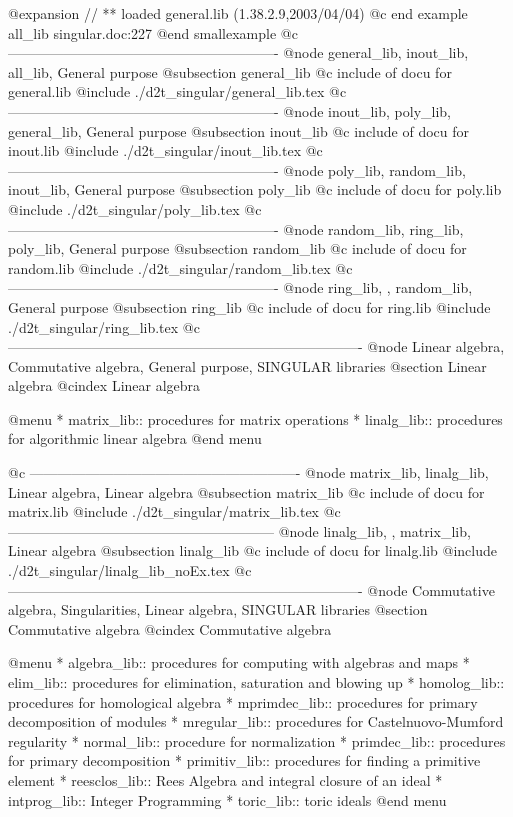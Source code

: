 @expansion{} // ** loaded general.lib (1.38.2.9,2003/04/04)
@c end example all_lib singular.doc:227
@end smallexample
@c ----------------------------------------------------------
@node general_lib, inout_lib, all_lib, General purpose
@subsection general_lib
@c include of docu for general.lib
@include ./d2t_singular/general_lib.tex
@c ----------------------------------------------------------
@node inout_lib, poly_lib, general_lib, General purpose
@subsection inout_lib
@c include of docu for inout.lib
@include ./d2t_singular/inout_lib.tex
@c ----------------------------------------------------------
@node poly_lib, random_lib, inout_lib, General purpose
@subsection poly_lib
@c include of docu for poly.lib
@include ./d2t_singular/poly_lib.tex
@c ----------------------------------------------------------
@node random_lib, ring_lib, poly_lib, General purpose
@subsection random_lib
@c include of docu for random.lib
@include ./d2t_singular/random_lib.tex
@c ----------------------------------------------------------
@node ring_lib, , random_lib, General purpose
@subsection ring_lib
@c include of docu for ring.lib
@include ./d2t_singular/ring_lib.tex
@c ----------------------------------------------------------------------------
@node Linear algebra, Commutative algebra, General purpose, SINGULAR libraries
@section Linear algebra
@cindex Linear algebra

@menu
* matrix_lib:: procedures for matrix operations
* linalg_lib:: procedures for algorithmic linear algebra
@end menu

@c ----------------------------------------------------------
@node matrix_lib, linalg_lib,  Linear algebra, Linear algebra
@subsection matrix_lib
@c include of docu for matrix.lib
@include ./d2t_singular/matrix_lib.tex
@c ---------------------------------------------------------
@node linalg_lib, , matrix_lib, Linear algebra
@subsection linalg_lib
@c include of docu for linalg.lib
@include ./d2t_singular/linalg_lib_noEx.tex
@c ----------------------------------------------------------------------------
@node Commutative algebra, Singularities, Linear algebra, SINGULAR libraries
@section Commutative algebra
@cindex Commutative algebra

@menu
* algebra_lib:: procedures for computing with algebras and maps
* elim_lib:: procedures for elimination, saturation and blowing up
* homolog_lib:: procedures for homological algebra
* mprimdec_lib:: procedures for primary decomposition of modules
* mregular_lib:: procedures for Castelnuovo-Mumford regularity
* normal_lib:: procedure for normalization
* primdec_lib:: procedures for primary decomposition
* primitiv_lib:: procedures for finding a primitive element
* reesclos_lib:: Rees Algebra and integral closure of an ideal
* intprog_lib:: Integer Programming
* toric_lib:: toric ideals
@end menu

